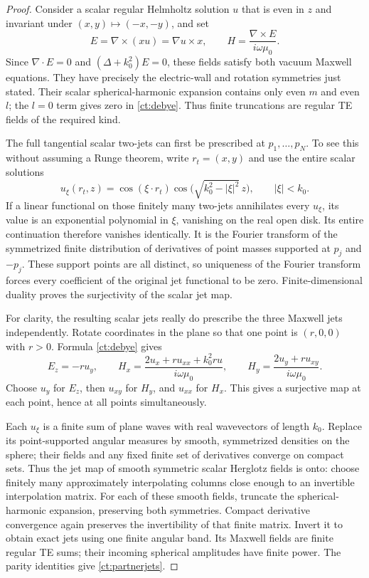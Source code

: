 \begin{proof}
Consider a scalar regular Helmholtz solution $u$ that is even in $z$
and invariant under $(x,y)\mapsto(-x,-y)$, and set
\begin{equation}\label{ct:debye}
 E=\nabla\times(xu)=\nabla u\times x,
 \qquad H=\frac{\nabla\times E}{i\omega\mu_0}.
\end{equation}
Since $\nabla\cdot E=0$ and $(\Delta+k_0^2)E=0$, these fields
satisfy both vacuum Maxwell equations. They have precisely the
electric-wall and rotation symmetries just stated. Their scalar
spherical-harmonic expansion contains only even $m$ and even $l$;
the $l=0$ term gives zero in \eqref{ct:debye}. Thus finite truncations
are regular TE fields of the required kind.

The full tangential scalar two-jets can first be prescribed at
$p_1,\ldots,p_N$. To see this without assuming a Runge theorem,
write $r_t=(x,y)$ and use the entire scalar solutions
\[
 u_\xi(r_t,z)=\cos(\xi\cdot r_t)
            \cos\bigl(\sqrt{k_0^2-|\xi|^2}\,z\bigr),
 \qquad |\xi|<k_0.
\]
If a linear functional on those finitely many two-jets annihilates
every $u_\xi$, its value is an exponential polynomial in $\xi$,
vanishing on the real open disk. Its entire continuation therefore
vanishes identically. It is the Fourier transform of the symmetrized
finite distribution of derivatives of point masses supported at
$p_j$ and $-p_j$. These support points are all distinct, so uniqueness
of the Fourier transform forces every coefficient of the original
jet functional to be zero. Finite-dimensional duality proves the
surjectivity of the scalar jet map.

For clarity, the resulting scalar jets really do prescribe the three
Maxwell jets independently. Rotate coordinates in the plane so that
one point is $(r,0,0)$ with $r>0$. Formula \eqref{ct:debye} gives
\begin{equation}\label{ct:jetmap}
 E_z=-r u_y,\qquad
 H_x=\frac{2u_x+r u_{xx}+k_0^2r u}{i\omega\mu_0},\qquad
 H_y=\frac{2u_y+r u_{xy}}{i\omega\mu_0}.
\end{equation}
Choose $u_y$ for $E_z$, then $u_{xy}$ for $H_y$, and $u_{xx}$
for $H_x$. This gives a surjective map at each point, hence at all
points simultaneously.

Each $u_\xi$ is a finite sum of plane waves with real wavevectors
of length $k_0$. Replace its point-supported angular measures by
smooth, symmetrized densities on the sphere; their fields and any
fixed finite set of derivatives converge on compact sets. Thus the
jet map of smooth symmetric scalar Herglotz fields is onto: choose
finitely many approximately interpolating columns close enough to
an invertible interpolation matrix. For each of these smooth fields,
truncate the spherical-harmonic expansion, preserving both
symmetries. Compact derivative convergence again preserves the
invertibility of that finite matrix. Invert it to obtain exact jets
using one finite angular band. Its Maxwell fields are finite regular
TE sums; their incoming spherical amplitudes have finite power.
The parity identities give \eqref{ct:partnerjets}.
\end{proof}

